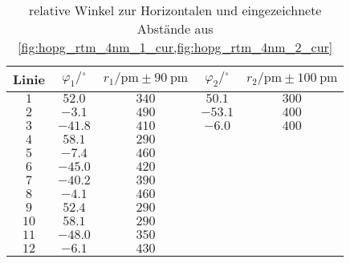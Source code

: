 \begin{table}[htbp]
   \centering
\caption{relative Winkel zur Horizontalen und eingezeichnete Abstände aus \cref{fig:hopg_rtm_4nm_1_cur,fig:hopg_rtm_4nm_2_cur}}
\begin{tabular}{c c c c c}
\hline Linie & $\varphi_1 / {}^\circ$ & $r_1/\unit{\pm} \pm \SI{90}{\pm}$ & $\varphi_2 / {}^\circ$ & $r_2/\unit{\pm} \pm \SI{100}{\pm}$ \\ 
\hline
$\num{1}$ & $\num{52.0}$ & $\num{340}$ & $\num{50.1}$ & $\num{300}$ \\
$\num{2}$ & $\num{-3.1}$ & $\num{490}$ & $\num{-53.1}$ & $\num{400}$ \\
$\num{3}$ & $\num{-41.8}$ & $\num{410}$ & $\num{-6.0}$ & $\num{400}$ \\
$\num{4}$ & $\num{58.1}$ & $\num{290}$ &    &    \\
$\num{5}$ & $\num{-7.4}$ & $\num{460}$ &    &    \\
$\num{6}$ & $\num{-45.0}$ & $\num{420}$ &    &    \\
$\num{7}$ & $\num{-40.2}$ & $\num{390}$ &    &    \\
$\num{8}$ & $\num{-4.1}$ & $\num{460}$ &    &    \\
$\num{9}$ & $\num{52.4}$ & $\num{290}$ &    &    \\
$\num{10}$ & $\num{58.1}$ & $\num{290}$ &    &    \\
$\num{11}$ & $\num{-48.0}$ & $\num{350}$ &    &    \\
$\num{12}$ & $\num{-6.1}$ & $\num{430}$ &    &    \\
\hline\end{tabular}
\end{table}